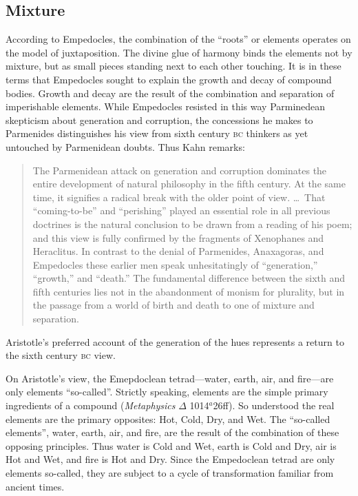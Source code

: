
\subsection{Mixture} %
\label{sub:mixture}

According to Empedocles, the combination of the ``roots'' or elements operates on the model of juxtaposition. The divine glue of harmony binds the elements not by mixture, but as small pieces standing next to each other touching. It is in these terms that Empedocles sought to explain the growth and decay of compound bodies. Growth and decay are the result of the combination and separation of imperishable elements. While Empedocles resisted in this way Parminedean skepticism about generation and corruption, the concessions he makes to Parmenides distinguishes his view from sixth century \textsc{bc} thinkers as yet untouched by Parmenidean doubts. Thus Kahn remarks:
\begin{quote}
	The Parmenidean attack on generation and corruption dominates the entire development of natural philosophy in the fifth century. At the same time, it signifies a radical break with the older point of view. \ldots\ That ``coming-to-be'' and ``perishing'' played an essential role in all previous doctrines is the natural conclusion to be drawn from a reading of his poem; and this view is fully confirmed by the fragments of Xenophanes and Heraclitus. In contrast to the denial of Parmenides, Anaxagoras, and Empedocles these earlier men speak unhesitatingly of ``generation,'' ``growth,'' and ``death.'' The fundamental difference between the sixth and fifth centuries lies not in the abandonment of monism for plurality, but in the passage from a world of birth and death to one of mixture and separation. \citep[154--155]{Kahn:1994qf}
\end{quote}
Aristotle's preferred account of the generation of the hues represents a return to the sixth century \textsc{bc} view.

On Aristotle's view, the Emepdoclean tetrad---water, earth, air, and fire---are only elements ``so-called''. Strictly speaking, elements are the simple primary ingredients of a compound (\emph{Metaphysics} \( \Delta \) 1014\( ^{a} \)26ff). So understood the real elements are the primary opposites: Hot, Cold, Dry, and Wet. The ``so-called elements'', water, earth, air, and fire, are the result of the combination of these opposing principles. Thus water is Cold and Wet, earth is Cold and Dry, air is Hot and Wet, and fire is Hot and Dry. Since the Empedoclean tetrad are only elements so-called, they are subject to a cycle of transformation familiar from ancient times. 

